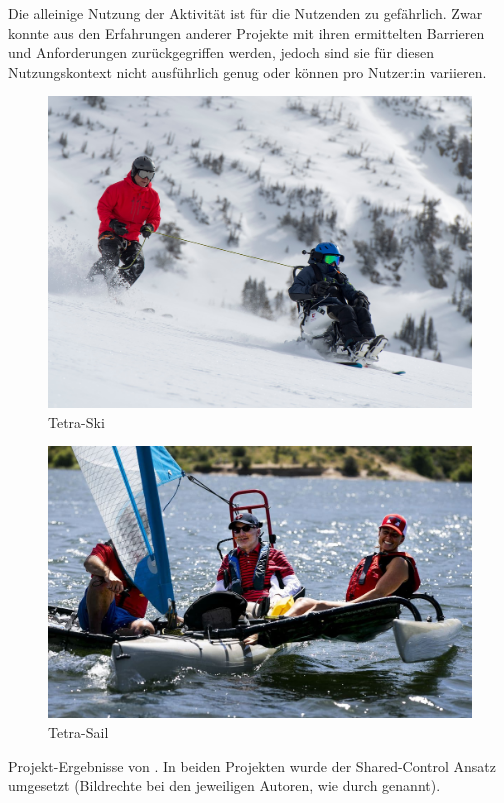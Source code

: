 \documentclass[sigchi-a,screen,nonacm,language=german]{acmart}
\theoremstyle{acmdefinition}
\begin{document}
Die alleinige Nutzung der Aktivität ist für die Nutzenden zu gefährlich. Zwar konnte aus den Erfahrungen anderer Projekte mit ihren ermittelten Barrieren und Anforderungen zurückgegriffen werden, jedoch sind sie für diesen Nutzungskontext nicht ausführlich genug oder können pro Nutzer:in variieren.


\begin{marginfigure}
    \centering

    \begin{subfigure}[b]{\marginparwidth}

        \includegraphics[width=\linewidth]{media/alsaleem2020_tetra-ski.jpg}
        \caption{Tetra-Ski}\label{fig:alsaleem2020:tetra-ski}
        
    \end{subfigure}
    \hfill
    \begin{subfigure}[b]{\marginparwidth}

        \includegraphics[width=\linewidth]{media/alsaleem2020_tetra-sail.jpg}
        \caption{Tetra-Sail}\label{fig:alsaleem2020:tetra-sail}
        
    \end{subfigure}

    \caption{Projekt-Ergebnisse von \citet{alsaleem:2020:adaptive-outdoor-activities}. In beiden Projekten wurde der Shared-Control Ansatz umgesetzt (Bildrechte bei den jeweiligen Autoren, wie durch \citeauthor{alsaleem:2020:adaptive-outdoor-activities} genannt).}
    \label{fig:alsaleem2020}
\end{marginfigure}
\end{document}
